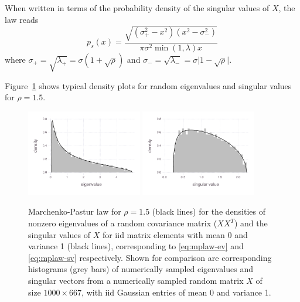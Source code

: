 \documentclass[review]{siamart0516}
\begin{document}
When written in terms of the probability density of the singular values of $X$,
the law reads
%
\begin{equation}
    \label{eq:mplaw-sv}
    p_s(x) = \frac {\sqrt{(\sigma_+^2-x^2)(x^2-\sigma_-^2)}} {\pi \sigma^2 \min(1, \lambda) x}
\end{equation}
%
where
$\sigma_+ = \sqrt{\lambda_+} = \sigma(1+\sqrt{\rho})$ and
$\sigma_- = \sqrt{\lambda_-} = \sigma\vert1-\sqrt{\rho}\vert$.

Figure~\ref{fig:mplaw} shows typical density plots for random eigenvalues
and singular values for $\rho=1.5$.

\begin{figure}
\caption{Marchenko-Pastur law for $\rho=1.5$ (black lines) for the densities of
nonzero eigenvalues of a random covariance matrix ($XX^{T}$) and the singular
values of $X$ for iid matrix elements with mean 0 and variance 1
(black lines), corresponding to \eqref{eq:mplaw-ev} and \eqref{eq:mplaw-sv}
respectively.
Shown for comparison are corresponding histograms (grey
bars) of numerically sampled eigenvalues and singular vectors from
a numerically sampled random matrix $X$ of size $1000\times667$,
with iid Gaussian entries of mean 0 and variance 1.
\label{fig:mplaw}
}

\includegraphics[width=0.45\textwidth]{fig/mplaw/fig-mplaw-ev}
%
\includegraphics[width=0.45\textwidth]{fig/mplaw/fig-mplaw-sv}
\end{figure}
\end{document}
